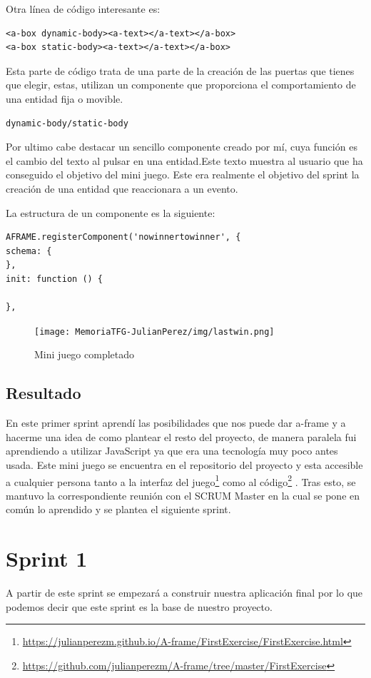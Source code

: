 \documentclass[a4paper, 12pt]{book}
\begin{document}
Otra línea de código interesante es:
\begin{verbatim}
<a-box dynamic-body><a-text></a-text></a-box>
<a-box static-body><a-text></a-text></a-box>
\end{verbatim} 

Esta parte de código  trata de una parte de la creación de las puertas que tienes que elegir, estas, utilizan un componente que proporciona el comportamiento de una entidad fija o movible.\begin{verbatim}dynamic-body/static-body \end{verbatim}

Por ultimo cabe destacar un sencillo componente creado por mí, cuya función es el cambio del texto al pulsar en una entidad.Este texto muestra al usuario que ha conseguido el objetivo del mini juego.  Este era realmente el objetivo del sprint la creación de una entidad que reaccionara a un evento.

La estructura de un componente es la siguiente:
\begin{verbatim}
AFRAME.registerComponent('nowinnertowinner', {
schema: {
},
init: function () {

},
\end{verbatim} 

         \begin{figure}[H]
  \centering
  \texttt{[image: MemoriaTFG-JulianPerez/img/lastwin.png]}
  \caption{Mini juego completado}\label{scrum}
\end{figure}

\subsection{Resultado}
En este primer sprint aprendí las posibilidades que nos puede dar a-frame y a hacerme una idea de como plantear el resto del proyecto, de manera paralela fui aprendiendo a utilizar JavaScript ya que era una tecnología muy poco antes usada. Este mini juego se encuentra en el repositorio del proyecto y esta accesible a cualquier persona tanto a la interfaz del juego\footnote{\url{https://julianperezm.github.io/A-frame/FirstExercise/FirstExercise.html}}  como al código\footnote{\url{https://github.com/julianperezm/A-frame/tree/master/FirstExercise}} . Tras esto, se mantuvo la correspondiente reunión con el SCRUM Master en la cual se pone en común lo aprendido y se plantea el siguiente sprint.

\section{Sprint 1}
A partir de este sprint se empezará a construir nuestra aplicación final por lo que podemos decir que este sprint es la base de nuestro proyecto. 
\end{document}
